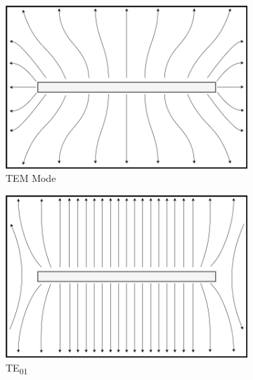 \begin{figure}[h]
    \centering
    \begin{subfigure}[b]{0.3\linewidth}
        \centering
        \includegraphics[width=\linewidth]{content/10_theory/img/tem_cell_mode.png}
        \caption{TEM Mode}
        \label{fig:tem_mode}
    \end{subfigure}
    \begin{subfigure}[b]{0.3\linewidth}
        \centering
        \includegraphics[width=\linewidth]{content/10_theory/img/te01_mode.png}
        \caption{TE\textsubscript{01}}
        \label{fig:te01_mode}
    \end{subfigure}
    \begin{subfigure}[b]{0.3\linewidth}
        \centering

\end{subfigure}
\end{figure}
